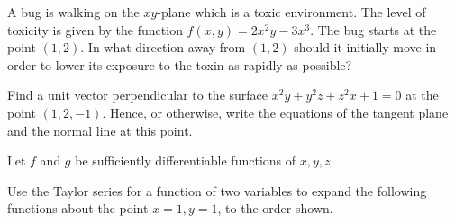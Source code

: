 \documentclass[answers]{exam}
\def\del{\boldsymbol{\nabla}}
\begin{document}
\begin{questions}
\question%
A bug is walking on the $x y$-plane which is a toxic environment. The level of toxicity is given by the function $f(x, y)=2 x^{2} y-3 x^{3}$. The bug starts at the point $(1,2)$. In what direction away from $(1,2)$ should it initially move in order to lower its exposure to the toxin as rapidly as possible?



\question%
Find a unit vector perpendicular to the surface $x^{2} y+y^{2} z+z^{2} x+1=0$ at the point $(1,2,-1)$. Hence, or otherwise, write the equations of the tangent plane and the normal line at this point.



\question%
Let $f$ and $g$ be sufficiently differentiable functions of $x, y, z$.



\question%
Use the Taylor series for a function of two variables to expand the following functions about the point $x=1, y=1$, to the order shown.

\end{questions}
\end{document}
